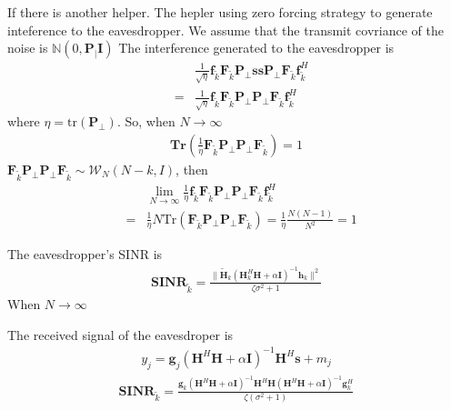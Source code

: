 \documentclass[12pt,journal,draftclsnofoot,onecolumn]{IEEEtran}
\begin{document}
If there is another helper. The hepler using zero forcing strategy to generate inteference to the eavesdropper. We assume that the transmit covriance of the noise is $\mathbb{N}(0, \mathbf{P_{\vert}\mathbf{I}})$
The interference generated to the eavesdropper is
\begin{eqnarray}
&&\frac{1}{\sqrt{\eta}}\mathbf{f}_{\tilde{k}}\mathbf{F}_{\tilde{k}}\mathbf{P}_{\perp}\mathbf{s}\mathbf{s}\mathbf{P}_{\perp}\mathbf{F}_{\tilde{k}}\mathbf{f}_{\tilde{k}}^H\\
&=&\frac{1}{\sqrt{\eta}}\mathbf{f}_{\tilde{k}}\mathbf{F}_{\tilde{k}}\mathbf{P}_{\perp}\mathbf{P}_{\perp}\mathbf{F}_{\tilde{k}}\mathbf{f}_{\tilde{k}}^H
\end{eqnarray}
where $\eta = \mathrm{tr}(\mathbf{P}_{\perp})$.
So, when $N \to \infty$
\begin{eqnarray}
\mathbf{Tr}(\frac{1}{\eta}\mathbf{F}_{\tilde{k}}\mathbf{P}_{\perp}\mathbf{P}_{\perp}\mathbf{F}_{\tilde{k}}) = 1
\end{eqnarray}
$\mathbf{F}_{\tilde{k}}\mathbf{P}_{\perp}\mathbf{P}_{\perp}\mathbf{F}_{\tilde{k}} \sim \mathcal{W}_N(N-k, I)$, then
\begin{eqnarray}
&&\lim_{N \to \infty}\frac{1}{\eta}\mathbf{f}_{\tilde{k}}\mathbf{F}_{\tilde{k}}\mathbf{P}_{\perp}\mathbf{P}_{\perp}\mathbf{F}_{\tilde{k}}\mathbf{f}_{\tilde{k}}^H\\
&=& \frac{1}{\eta}N \mathrm{Tr}\left(\mathbf{F}_{\tilde{k}}\mathbf{P}_{\perp}\mathbf{P}_{\perp}\mathbf{F}_{\tilde{k}}\right) = \frac{1}{\eta}\frac{N(N-1)}{N^2} = 1
\end{eqnarray}



The eavesdropper's SINR is
\begin{eqnarray}
\mathbf{SINR}_{\tilde{k}} = \frac{\|\tilde{\mathbf{H}}_k\left(\mathbf{H}_k^H\mathbf{H} + \alpha\mathbf{I}\right)^{-1}\mathbf{h}_k\|^2}{\zeta\sigma^2 + 1}
\end{eqnarray}
When $N \to \infty$







The received signal of the eavesdroper is 
\begin{eqnarray}
y_j = \mathbf{g}_j\left(\mathbf{H}^H\mathbf{H} + \alpha\mathbf{I}\right)^{-1}\mathbf{H}^H\mathbf{s} + m_j
\end{eqnarray}	
\begin{eqnarray}
\mathbf{SINR}_{\tilde{k}} = \frac{\mathbf{g}_k\left(\mathbf{H}^H\mathbf{H} + \alpha\mathbf{I}\right)^{-1}\mathbf{H}^H\mathbf{H}\left(\mathbf{H}^H\mathbf{H} + \alpha\mathbf{I}\right)^{-1}\mathbf{g}_k^H}{ \zeta(\sigma^2 + 1)}
\end{eqnarray}
\end{document}
